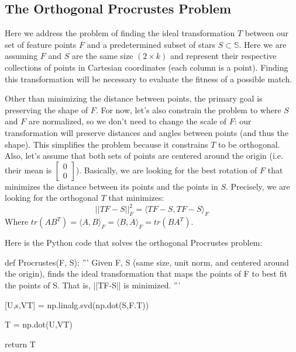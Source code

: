 \documentclass[paper=a4, fontsize=11pt]{scrartcl} %
\begin{document}
\subsection{The Orthogonal Procrustes Problem\cite{Everson1997}}
Here we address the problem of finding the ideal transformation $T$ between our set of feature points $F$ and a predetermined subset of stars $S\subset \mathbb{S}$. Here we are assuming $F$ and $S$ are the same size $(2\times k)$ and represent their respective collections of points in Cartesian coordinates (each column is a point).  Finding this transformation will be necessary to evaluate the fitness of a possible match.

Other than minimizing the distance between points, the primary goal is preserving the shape of $F$. For now, let's also constrain the problem to where $S$ and $F$ are normalized, so we don't need to change the scale of $F$: our transformation will preserve distances and angles between points (and thus the shape). This simplifies the problem because it constrains $T$ to be orthogonal. Also, let's assume that both sets of points are centered around the origin (i.e. their mean is $\begin{bmatrix}
0\\
0
\end{bmatrix}$). Basically, we are looking for the best rotation of $F$ that minimizes the distance between its points and the points in $S$. Precisely, we are looking for the orthogonal $T$ that minimizes: 
$$||TF-S||^2_F = \langle TF-S, TF-S\rangle_F$$
Where $tr(AB^T) = \langle A,B\rangle_F = \langle B,A\rangle_F = tr(BA^T)$.


Here is the Python code that solves the orthogonal Procrustes problem:

\begin{python}
def Procrustes(F, S):
	'''
	Given F, S (same size, unit norm, and centered around the origin), finds the
	ideal transformation that maps the points of F to best fit the points of S.
	That is, ||TF-S|| is minimized.
	'''
	
	[U,s,VT] = np.linalg.svd(np.dot(S,F.T))
	
	T = np.dot(U,VT)
	
	return T
\end{python}
\end{document}
